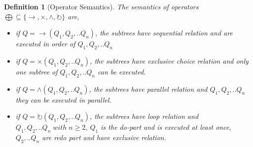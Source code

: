 \documentclass[]{article}
\newtheorem{mydef}{Definition}[section]
\begin{document}
\begin{mydef}[Operator Semantics] 
	The semantics of operators $\bigoplus \subseteq \{\rightarrow, \times, \land, \circlearrowright \}$ are,
	\begin{itemize}
		\item if $Q= \rightarrow(Q_1 , Q_2 ,.. Q_n)$, the subtrees have sequential relation and are executed in order of $Q_1,Q_2,..Q_n$
		\item if $Q= \times(Q_1 , Q_2 ,.. Q_n)$,  the subtrees have exclusive choice relation and only one subtree of $Q_1,Q_2,..Q_n$   can be executed.
		\item if $Q= \land (Q_1 , Q_2 ,.. Q_n)$,  the subtrees have parallel relation and $Q_1,Q_2,..Q_n$ they can be executed in parallel.
		\item if $Q= \circlearrowright(Q_1 , Q_2 ,.. Q_n)$,  the subtrees have loop relation and $Q_1,Q_2,..Q_n \; with\; n\geq2$, $Q_1$ is the do-part and is executed at least once, $Q_2,..Q_n$ are redo part and have exclusive relation.
	\end{itemize}
\end{mydef}
\end{document}
